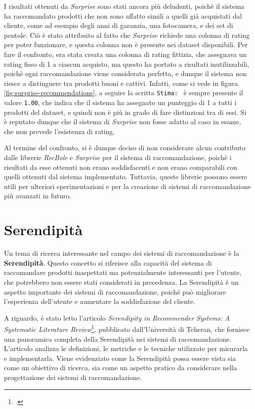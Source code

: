 I risultati ottenuti da \emph{Surprise} sono stati ancora più deludenti, poichè il sistema ha raccomandato prodotti che non sono affatto simili a quelli già acquistati dal cliente, come ad esempio degli anni di garanzia, una fotocamera, e dei set di pentole. Ciò è stato attribuito al fatto che \emph{Surprise} richiede una colonna di rating per poter funzionare, e questa colonna non è presente nei dataset disponibili. Per fare il confronto, era stata creata una colonna di rating fittizia, che assegnava un rating fisso di 1 a ciascun acquisto, ma questo ha portato a risultati inutilizzabili, poichè ogni raccomandazione viene considerata perfetta, e dunque il sistema non riesce a distinguere tra prodotti buoni e cattivi. Infatti, come si vede in figura \ref{fig:surprise-recommendations}, a seguire la scritta \texttt{Stima: } è sempre presente il valore \texttt{1.00}, che indica che il sistema ha assegnato un punteggio di 1 a tutti i prodotti del dataset, e quindi non è più in grado di fare distinzioni tra di essi. Si è reputato dunque che il sistema di \emph{Surprise} non fosse adatto al caso in esame, che non prevede l'esistenza di rating.

Al termine del confronto, si è dunque deciso di non considerare alcun contributo dalle librerie \emph{RecBole} e \emph{Surprise} per il sistema di raccomandazione, poichè i risultati da esse ottenuti non erano soddisfacenti e non erano comparabili con quelli ottenuti dal sistema implementato. Tuttavia, queste librerie possono essere utili per ulteriori sperimentazioni e per la creazione di sistemi di raccomandazione più avanzati in futuro.


\section{Serendipità}

Un tema di ricerca interessante nel campo dei sistemi di raccomandazione è la \textbf{Serendipità}. Questo concetto si riferisce alla capacità del sistema di raccomandare prodotti inaspettati ma potenzialmente interessanti per l'utente, che potrebbero non essere stati considerati in precedenza. La Serendipità è un aspetto importante dei sistemi di raccomandazione, poiché può migliorare l'esperienza dell'utente e aumentare la soddisfazione del cliente.

A riguardo, è stato letto l'articolo \emph{Serendipity in Recommender Systems: A Systematic Literature Review}\footcite{article:serendipity-recommender-systems}, pubblicato dall'Università di Teheran, che fornisce una panoramica completa della Serendipità nei sistemi di raccomandazione. L'articolo analizza le definizioni, le metriche e le tecniche utilizzate per misurarla e implementarla. Viene evidenziato come la Serendipità possa essere vista sia come un obiettivo di ricerca, sia come un aspetto pratico da considerare nella progettazione dei sistemi di raccomandazione.

